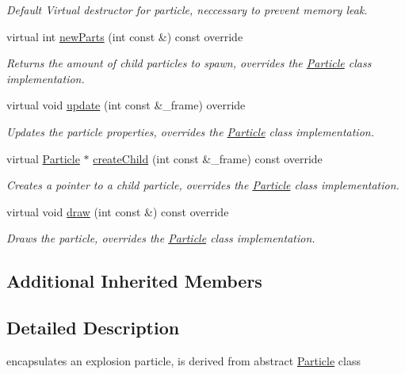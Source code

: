 \begin{DoxyCompactItemize}
\begin{DoxyCompactList}\small\item\em Default Virtual destructor for particle, neccessary to prevent memory leak. \end{DoxyCompactList}\item 
virtual int \hyperlink{classExplosionParticle_a302953be6e09fa22437248d175906e55}{new\-Parts} (int const \&) const override
\begin{DoxyCompactList}\small\item\em Returns the amount of child particles to spawn, overrides the \hyperlink{classParticle}{Particle} class implementation. \end{DoxyCompactList}\item 
virtual void \hyperlink{classExplosionParticle_ac1c36920bf241f397c639fdaac40a9f9}{update} (int const \&\-\_\-frame) override
\begin{DoxyCompactList}\small\item\em Updates the particle properties, overrides the \hyperlink{classParticle}{Particle} class implementation. \end{DoxyCompactList}\item 
virtual \hyperlink{classParticle}{Particle} $\ast$ \hyperlink{classExplosionParticle_a1948c2b0f3b39d303b2d8cef6b0e0701}{create\-Child} (int const \&\-\_\-frame) const override
\begin{DoxyCompactList}\small\item\em Creates a pointer to a child particle, overrides the \hyperlink{classParticle}{Particle} class implementation. \end{DoxyCompactList}\item 
virtual void \hyperlink{classExplosionParticle_a0e3a9cd71e0d13732254f9184b7f38e9}{draw} (int const \&) const override
\begin{DoxyCompactList}\small\item\em Draws the particle, overrides the \hyperlink{classParticle}{Particle} class implementation. \end{DoxyCompactList}\end{DoxyCompactItemize}
\subsection*{Additional Inherited Members}


\subsection{Detailed Description}
encapsulates an explosion particle, is derived from abstract \hyperlink{classParticle}{Particle} class 

